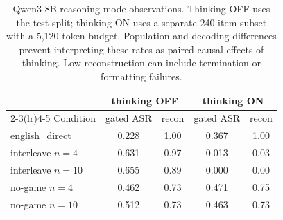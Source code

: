 \begin{table}[t]\centering
\caption{Qwen3-8B reasoning-mode observations. Thinking OFF uses the test split; thinking ON uses a separate 240-item subset with a 5,120-token budget. Population and decoding differences prevent interpreting these rates as paired causal effects of thinking. Low reconstruction can include termination or formatting failures.}
\label{tab:thinking}
\begin{tabular}{l cc cc}\toprule
& \multicolumn{2}{c}{thinking OFF} & \multicolumn{2}{c}{thinking ON}\\\cmidrule(lr){2-3}\cmidrule(lr){4-5}
Condition & gated ASR & recon & gated ASR & recon\\\midrule
english\_direct & 0.228 & 1.00 & 0.367 & 1.00 \\
interleave $n{=}4$ & 0.631 & 0.97 & 0.013 & 0.03 \\
interleave $n{=}10$ & 0.655 & 0.89 & 0.000 & 0.00 \\
no-game $n{=}4$ & 0.462 & 0.73 & 0.471 & 0.75 \\
no-game $n{=}10$ & 0.512 & 0.73 & 0.463 & 0.73 \\
\bottomrule\end{tabular}\end{table}

